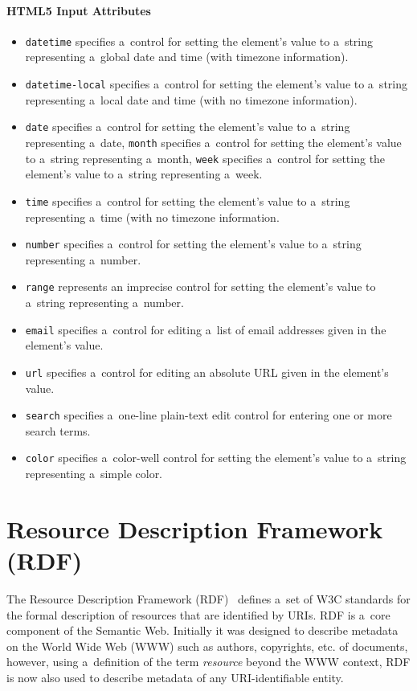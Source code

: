 \paragraph{HTML5 Input Attributes}
\begin{itemize}
\item \texttt{datetime} specifies a~control for setting the element's value
to a~string representing a~global date and time (with timezone information).
\item \texttt{datetime-local} specifies a~control for setting the element's value
to a~string representing a~local date and time (with no timezone information).
\item \texttt{date} specifies a~control for setting the element's value
to a~string representing a~date, \texttt{month} specifies a~control
for setting the element's value to a~string
representing a~month, \texttt{week} specifies a~control for setting the element's value
to a~string representing a~week.
\item \texttt{time} specifies a~control for setting the element's value
to a~string representing a~time (with no timezone information.
\item \texttt{number} specifies a~control for setting the element's value
to a~string representing a~number.
\item \texttt{range}  represents an imprecise control for setting the element's value
to a~string representing a~number.
\item \texttt{email} specifies a~control for editing a~list of email addresses
given in the element's value.
\item \texttt{url} specifies a~control for editing an absolute URL
given in the element's value.
\item \texttt{search} specifies a~one-line plain-text edit control
for entering one or more search terms.
\item \texttt{color} specifies a~color-well control for setting the element's value
to a~string representing a~simple color.
\end{itemize}

\section{Resource Description Framework (RDF)} \label{sec:rdf}
The Resource Description Framework (RDF)~\cite{Klyne2004} defines
a~set of W3C standards for the formal description of resources that are identified by URIs.
RDF is a~core component of the Semantic Web.
Initially it was designed to describe metadata on the World Wide Web (WWW) such as authors,
copyrights, etc. of documents, however, using a~definition of the term \emph{resource}
beyond the WWW context, RDF is now also used to describe metadata of any URI-identifiable entity.

